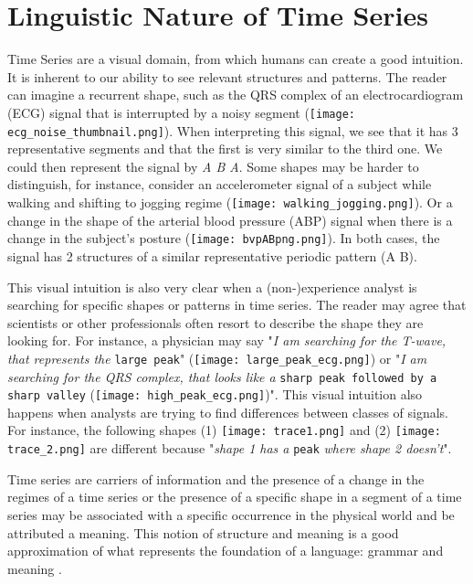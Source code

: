 \section{Linguistic Nature of Time Series}
\label{sub:context1}

Time Series are a visual domain, from which humans can create a good intuition. It is inherent to our ability to see relevant structures and patterns. The reader can imagine a recurrent shape, such as the \textcolor{myblue}{QRS complex} of an electrocardiogram (ECG) signal that is interrupted by a \textcolor{myred}{noisy} segment (\texttt{[image: ecg\_noise\_thumbnail.png]}). When interpreting this signal, we see that it has 3 representative segments and that the first is very similar to the third one. We could then represent the signal by \textit{\textcolor{myblue}{A} \textcolor{myred}{B} \textcolor{myblue}{A}}. Some shapes may be harder to distinguish, for instance, consider an accelerometer signal of a subject while \textcolor{myblue}{walking} and shifting to \textcolor{mygreen}{jogging} regime (\texttt{[image: walking\_jogging.png]}). Or a change in the shape of the arterial blood pressure (ABP) signal when there is a change in the subject's posture (\texttt{[image: bvpABpng.png]}). In both cases, the signal has 2 structures of a similar representative periodic pattern (\textcolor{myblue}{A} \textcolor{mygreen}{B}).

This visual intuition is also very clear when a (non-)experience analyst is searching for specific shapes or patterns in time series. The reader may agree that scientists or other professionals often resort to describe the shape they are looking for. For instance, a physician may say "\textit{I am searching for the T-wave, that represents the} \texttt{large peak}" (\texttt{[image: large\_peak\_ecg.png]}) or "\textit{I am searching for the QRS complex, that looks like a} \texttt{sharp peak followed by a sharp valley} (\texttt{[image: high\_peak\_ecg.png]})". This visual intuition also happens when analysts are trying to find differences between classes of signals. For instance, the following shapes (1) \texttt{[image: trace1.png]} and (2) \texttt{[image: trace\_2.png]} are different because "\textit{shape 1 has a} \texttt{peak} \textit{where shape 2 doesn't}". 

Time series are carriers of information and the presence of a change in the regimes of a time series or the presence of a specific shape in a segment of a time series may be associated with a specific occurrence in the physical world and be attributed a meaning. This notion of structure and meaning is a good approximation of what represents the foundation of a language: grammar and meaning \cite{grammar}.

